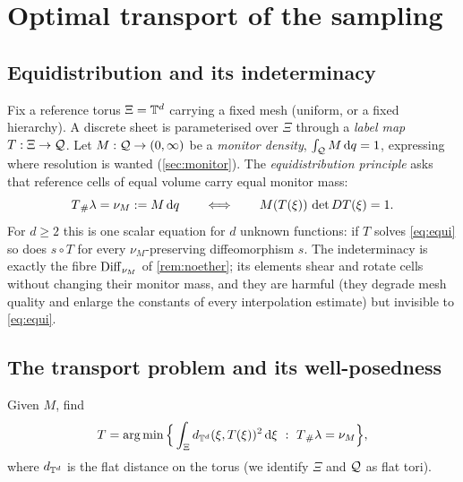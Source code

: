 \section{Optimal transport of the sampling}\label{sec:ot}

\subsection{Equidistribution and its indeterminacy}

Fix a reference torus $\Xi=\mathbb{T}^d$ carrying a fixed mesh (uniform, or a fixed hierarchy). A discrete sheet is
parameterised over $\Xi$ through a \emph{label map} $T:\Xi\to\mathcal{Q}$. Let $M:\mathcal{Q}\to(0,\infty)$ be a \emph{monitor
density}, $\int_{\mathcal{Q}} M\,\mathrm{d} q=1$, expressing where resolution is wanted (\cref{sec:monitor}). The
\emph{equidistribution principle} asks that reference cells of equal volume carry equal monitor mass:
\begin{equation}\label{eq:equi}
T{}_{\#}\lambda=\nu_M:=M\,\mathrm{d} q\qquad\Longleftrightarrow\qquad M(T(\xi))\,\det DT(\xi)=1 .
\end{equation}
For $d\ge2$ this is one scalar equation for $d$ unknown functions: if $T$ solves \eqref{eq:equi} so does
$s\circ T$ for every $\nu_M$-preserving diffeomorphism $s$. The indeterminacy is exactly the fibre $\operatorname{Diff}_{\nu_M}$
of \cref{rem:noether}; its elements shear and rotate cells without changing their monitor mass, and they are
harmful (they degrade mesh quality and enlarge the constants of every interpolation estimate) but invisible to \eqref{eq:equi}.

\subsection{The transport problem and its well-posedness}

\begin{definition}\label{def:ot}
Given $M$, find
\begin{equation}\label{eq:monge}
T=\arg\min\Big\{\int_\Xi d_{\T^d}(\xi,T(\xi))^2\,\dd\xi\ :\ T\pf\lambda=\nu_M\Big\},
\end{equation}
where $d_{\mathbb{T}^d}$ is the flat distance on the torus (we identify $\Xi$ and $\mathcal{Q}$ as flat tori).
\end{definition}

